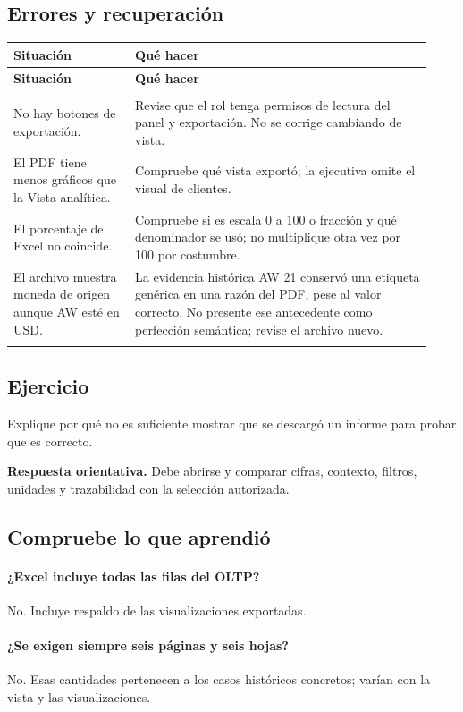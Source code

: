 \subsection{Errores y recuperación}
\begingroup
\fontsize{10}{12.5}\selectfont
\setlength{\tabcolsep}{5pt}
\renewcommand{\arraystretch}{1.15}
\begin{longtable}{@{}>{\RaggedRight\arraybackslash}p{0.27\linewidth}>{\RaggedRight\arraybackslash}p{0.66\linewidth}@{}}
\toprule
\textbf{Situación} & \textbf{Qué hacer} \\
\midrule
\endfirsthead
\toprule
\textbf{Situación} & \textbf{Qué hacer} \\
\midrule
\endhead
\midrule
\multicolumn{2}{r}{\footnotesize Continúa en la página siguiente}\\
\endfoot
\bottomrule
\endlastfoot
No hay botones de exportación. & Revise que el rol tenga permisos de lectura del panel y exportación. No se corrige cambiando de vista. \\
\addlinespace[3pt]
El PDF tiene menos gráficos que la Vista analítica. & Compruebe qué vista exportó; la ejecutiva omite el visual de clientes. \\
\addlinespace[3pt]
El porcentaje de Excel no coincide. & Compruebe si es escala 0 a 100 o fracción y qué denominador se usó; no multiplique otra vez por 100 por costumbre. \\
\addlinespace[3pt]
El archivo muestra moneda de origen aunque AW esté en USD. & La evidencia histórica AW 21 conservó una etiqueta genérica en una razón del PDF, pese al valor correcto. No presente ese antecedente como perfección semántica; revise el archivo nuevo. \\
\addlinespace[3pt]
\end{longtable}
\endgroup

\subsection{Ejercicio}
Explique por qué no es suficiente mostrar que se descargó un informe para probar que es correcto.

\textbf{Respuesta orientativa.} Debe abrirse y comparar cifras, contexto, filtros, unidades y trazabilidad con la selección autorizada.

\subsection{Compruebe lo que aprendió}
\paragraph{¿Excel incluye todas las filas del OLTP?} No. Incluye respaldo de las visualizaciones exportadas.

\paragraph{¿Se exigen siempre seis páginas y seis hojas?} No. Esas cantidades pertenecen a los casos históricos concretos; varían con la vista y las visualizaciones.


